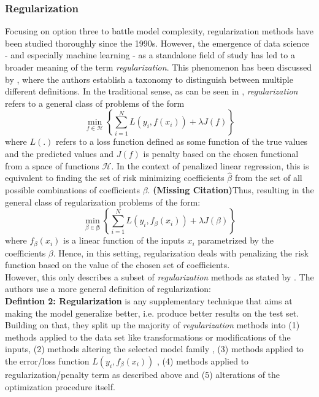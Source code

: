 \documentclass[12pt,a4paper]{article}
\newcommand{\MC}{\textbf{(Missing Citation)}} %
\begin{document}
\subsubsection{Regularization}

Focusing on option three to battle model complexity, regularization methods have been studied thoroughly since the 1990s. However, the emergence of data science - and especially machine learning - as a standalone field of study has led to a broader meaning of the term \textit{regularization}. This phenomenon has been discussed by \textcite{Taxonomy2017}, where the authors establish a taxonomy to distinguish between multiple different definitions. In the traditional sense, as can be seen in \textcite[167--170]{ESL2009}, \textit{regularization} refers to a general class of problems of the form
\[
\underset{f \in \mathcal{H}}{\min}\left\{\sum_{i=1}^N L(y_i, f(x_i)) + \lambda{J}(f)\right\}
\]
where $L(.)$ refers to a loss function defined as some function of the true values and the predicted values and $J(f)$ is penalty based on the chosen functional from a space of functions $\mathcal{H}$. In the context of penalized linear regression, this is equivalent to finding the set of risk minimizing coefficients $\hat{\beta}$ from the set of all possible combinations of coefficients $\beta$. \MC Thus, resulting in the general class of regularization problems of the form:
\[
\underset{\beta \in \boldsymbol{\beta}}{\min}\left\{\sum_{i=1}^N L(y_i, f_\beta(x_i)) + \lambda{J}(\beta)\right\}
\]
where $f_\beta(x_i)$ is a linear function of the inputs $x_i$ parametrized by the coefficients $\beta$. Hence, in this setting, regularization deals with penalizing the risk function based on the value of the chosen set of coefficients. \\
However, this only describes a subset of \textit{regularization} methods as stated by \textcite{Taxonomy2017}. The authors use a more general definition of regularization:\\

\textbf{Defintion 2: Regularization} is any supplementary technique that aims at making the model generalize better, i.e. produce better results on the test set.\\

Building on that, they split up the majority of \textit{regularization} methods into  (1) methods applied to the data set like transformations or modifications of the inputs, (2) methods altering the selected model family , (3) methods applied to the error/loss function $L(y_i, f_\beta(x_i))$ , (4) methods applied to regularization/penalty term as described above and (5) alterations of the optimization procedure itself. 
\end{document}
